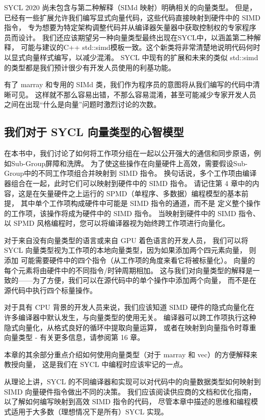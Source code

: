 \begin{remark}
SYCL 2020 尚未包含与第二种解释（SIMd 映射）明确相关的向量类型。
但是，已经有一些扩展允许我们编写显式向量代码，这些代码直接映射到硬件中的 SIMD 指令，
专为想要为特定架构调整代码并从编译器矢量器中获取控制权的专家程序员而设计。
我们还应该期望另一种向量类型最终出现在SYCL中，以涵盖第二种解释，
可能与建议的C++ std::simd模板一致。这个新类将非常清楚地说明代码何时以显式向量样式编写，以减少混淆。
SYCL 中现有的扩展和未来的类似 std::simd 的类型都是我们预计很少有开发人员使用的利基功能。

有了 marray 和专用的 SIMd 类，我们作为程序员的意图将从我们编写的代码中清晰可见。
这样就不那么容易出错，不那么容易混淆，甚至可能减少专家开发人员之间在出现“什么是向量”问题时激烈讨论的次数。
\end{remark}

\subsection{我们对于 SYCL 向量类型的心智模型}
在本书中，我们讨论了如何将工作项分组在一起以公开强大的通信和同步原语，例如Sub-Group屏障和洗牌。 
为了使这些操作在向量硬件上高效，需要假设Sub-Group中的不同工作项组合并映射到 SIMD 指令。 
换句话说，多个工作项由编译器组合在一起，此时它们可以映射到硬件中的 SIMD 指令。 
请记住第 4 章中的内容，这是在矢量硬件之上运行的 SPMD（单程序、多数据）编程模型的基本前提，
其中单个工作项构成硬件中可能是 SIMD 指令的通道，而不是 定义整个操作的工作项，该操作将成为硬件中的 SIMD 指令。 
当映射到硬件中的 SIMD 指令、以 SPMD 风格编程时，您可以将编译器视为始终跨工作项进行向量化。

对于来自没有向量类型的语言或来自 GPU 着色语言的开发人员，
我们可以将 SYCL 向量类型视为工作项的本地向量类型，因为如果添加两个四元素向量，
则添加 可能需要硬件中的四个指令（从工作项的角度来看它将被标量化）。 
向量的每个元素将由硬件中的不同指令/时钟周期相加。 
这与我们对向量类型的解释是一致的——为了方便，我们可以在源代码中的单个操作中添加两个向量，
而不是在源代码中执行四个标量操作。

对于具有 CPU 背景的开发人员来说，我们应该知道 SIMD 硬件的隐式向量化在许多编译器中默认发生，与向量类型的使用无关。 
编译器可以跨工作项执行这种隐式向量化，从格式良好的循环中提取向量运算，
或者在映射到向量指令时尊重向量类型 - 有关更多信息，请参阅第 16 章。

本章的其余部分重点介绍如何使用向量类型（对于 marray 和 vec）的方便解释来教授向量，
这是我们在 SYCL 中编程时应该牢记的一点。

\begin{remark}[其他实现的可能！]
从理论上讲，SYCL 的不同编译器和实现可以对代码中的向量数据类型如何映射到 SIMD 向量硬件指令做出不同的决策。
我们应该阅读供应商的文档和优化指南，以了解如何编写映射到高效 SIMD 指令的代码，
尽管本章中描述的思维和编程模式适用于大多数（理想情况下是所有）SYCL 实现。
\end{remark}

